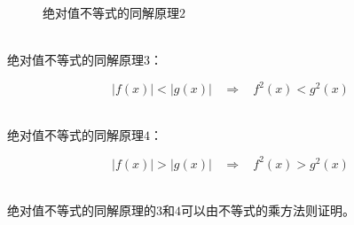 \documentclass[UTF8]{ctexart}
\begin{document}
    \begin{figure}[h]
        \begin{center}
            \caption{绝对值不等式的同解原理$2$}
        \end{center}
    \end{figure}\\
    绝对值不等式的同解原理$3$：
    \begin{large}
        \begin{equation*}
            \big|f(x)\big|<\big|g(x)\big|~~~~\Rightarrow~~~~f^2(x)<g^2(x)
        \end{equation*}
    \end{large}\\
    绝对值不等式的同解原理$4$：
    \begin{large}
        \begin{equation*}
            \big|f(x)\big|>\big|g(x)\big|~~~~\Rightarrow~~~~f^2(x)>g^2(x)
        \end{equation*}
    \end{large}\\
    绝对值不等式的同解原理的$3$和$4$可以由不等式的乘方法则证明。

\newpage
\end{document}
